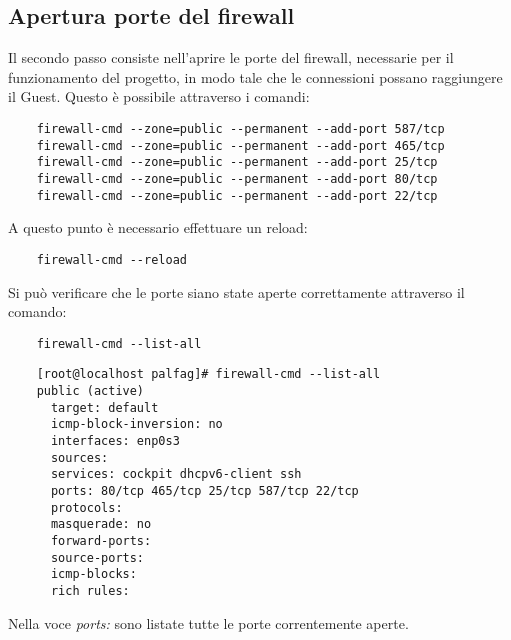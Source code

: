 \begin{table}[htp]
    \centering
    \caption{Tabella di traduzione NAT di VirtualBox.}\label{tabNAT}
    \end{table}
\pagebreak
\subsection{Apertura porte del firewall}

Il secondo passo consiste nell’aprire le porte del firewall, necessarie per il funzionamento del progetto, 
in modo tale che le connessioni possano raggiungere il Guest. Questo è possibile attraverso i comandi:
\begin{verbatim}
    firewall-cmd --zone=public --permanent --add-port 587/tcp
    firewall-cmd --zone=public --permanent --add-port 465/tcp
    firewall-cmd --zone=public --permanent --add-port 25/tcp
    firewall-cmd --zone=public --permanent --add-port 80/tcp
    firewall-cmd --zone=public --permanent --add-port 22/tcp
\end{verbatim}
A questo punto è necessario effettuare un reload:

\begin{verbatim}
    firewall-cmd --reload
\end{verbatim}
Si può verificare che le porte siano state aperte correttamente attraverso il comando:
\begin{verbatim}
    firewall-cmd --list-all
\end{verbatim}
\begin{verbatim}
    [root@localhost palfag]# firewall-cmd --list-all
    public (active)
      target: default
      icmp-block-inversion: no
      interfaces: enp0s3
      sources: 
      services: cockpit dhcpv6-client ssh
      ports: 80/tcp 465/tcp 25/tcp 587/tcp 22/tcp
      protocols: 
      masquerade: no
      forward-ports: 
      source-ports: 
      icmp-blocks: 
      rich rules: 
\end{verbatim}
Nella voce \textit{ports:} sono listate tutte le porte correntemente aperte.
\pagebreak
